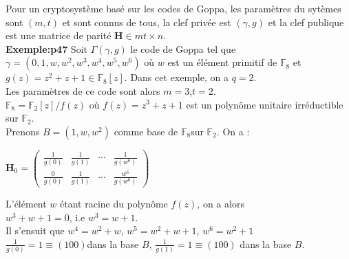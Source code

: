 \documentclass[12pt,openany]{report}
\begin{document}
Pour un cryptosystème basé sur les codes de Goppa, les paramètres du sytèmes sont $(m,t)$ et sont connus de tous, la clef privée est $(\gamma,g)$ et la clef publique est une matrice de parité $\mathbf{H} \in mt \times n.$\\

\textbf{Exemple:\cite{Ndollane}p47}\hspace{0.2cm} Soit $\Gamma(\gamma,g)$ le code de Goppa tel que $\gamma =(0,1,w,w^2,w^3,w^4,w^5,w^6)$ où $w$ est un élément primitif de $\mathbb{F}_8$ et $g(z)=z^2+z+1 \in \mathbb{F}_{8}[z].$ Dans cet exemple, on a $ q=2$.\\
Les paramètres de ce code sont alors $m=3$,$t=2$.\\
$\mathbb{F}_{8}=\mathbb{F}_{2}[z]/f(z)$ où $f(z)=z^3+z+1$ est un polynôme unitaire irréductible sur $ \mathbb{F}_{2}$.\\
Prenons $\mathit{B}=(1,w,w^2)$ comme base de $\mathbb{F}_{8}$sur $ \mathbb{F}_{2}$. On a :
\begin{center}

  $  \mathbf{H}_{0} =  \begin{pmatrix}
\frac{1}{g(0)}&\frac{1}{g(1)} & \cdots & \frac{1}{g(w^6)}\\
\frac{0}{g(0)}& \frac{1}{g(1)} & \cdots& \frac{w^6}{g(w^6)}
\end{pmatrix}$
\end{center}
L'élément $w$ étant racine du polynôme $f(z)$, on a alors \\
$ w^3+w+1=0$, i.e $w^3=w+1.$\\
Il s'ensuit que $w^4=w^2+w$, $w^5=w^2+w+1$, $w^6=w^2+1$\\
$\frac{1}{g(0)}=1 \equiv (100) $dans la base $\mathit{B}$,
$\frac{1}{g(1)}=1 \equiv (100)$ dans la base $\mathit{B}$.
\end{document}
